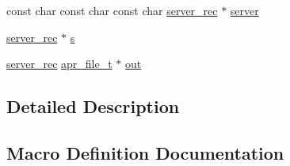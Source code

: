 \begin{DoxyCompactItemize}
\item 
const char const char const char \hyperlink{structserver__rec}{server\+\_\+rec} $\ast$ \hyperlink{group__APACHE__CORE__MUTEX_ga32727ee32089d3426d1d6a7280d28228}{server}
\item 
\hyperlink{structserver__rec}{server\+\_\+rec} $\ast$ \hyperlink{group__APACHE__CORE__MUTEX_gac4d70082e9974ebc2dabf813f28a90e6}{s}
\item 
\hyperlink{structserver__rec}{server\+\_\+rec} \hyperlink{structapr__file__t}{apr\+\_\+file\+\_\+t} $\ast$ \hyperlink{group__APACHE__CORE__MUTEX_gac9982b93474ad913f3fcbdcff95accf4}{out}
\end{DoxyCompactItemize}


\subsection{Detailed Description}


\subsection{Macro Definition Documentation}
